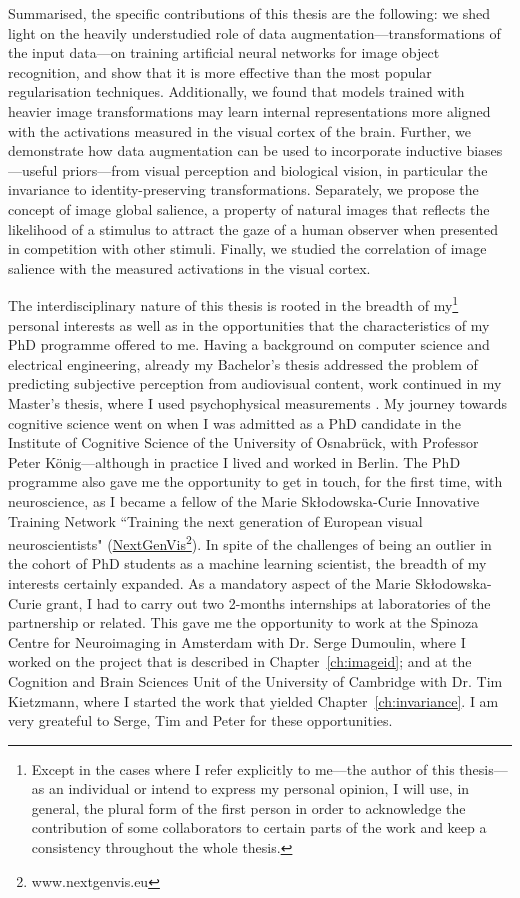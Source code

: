 {Summarised, the specific contributions of this thesis are the following: we shed light on the heavily understudied role of data augmentation---transformations of the input data---on training artificial neural networks for image object recognition, and show that it is more effective than the most popular regularisation techniques. Additionally, we found that models trained with heavier image transformations may learn internal representations more aligned with the activations measured in the visual cortex of the brain. Further, we demonstrate how data augmentation can be used to incorporate inductive biases---useful priors---from visual perception and biological vision, in particular the invariance to identity-preserving transformations. Separately, we propose the concept of image global salience, a property of natural images that reflects the likelihood of a stimulus to attract the gaze of a human observer when presented in competition with other stimuli. Finally, we studied the correlation of image salience with the measured activations in the visual cortex.

The interdisciplinary nature of this thesis is rooted in the breadth of my\footnote{Except in the cases where I refer explicitly to me---the author of this thesis---as an individual or intend to express my personal opinion, I will use, in general, the plural form of the first person in order to acknowledge the contribution of some collaborators to certain parts of the work and keep a consistency throughout the whole thesis.} personal interests as well as in the opportunities that the characteristics of my PhD programme offered to me. Having a background on computer science and electrical engineering, already my Bachelor's thesis \citep{hernandez2014bscthesis} addressed the problem of predicting subjective perception from audiovisual content, work continued in my Master's thesis, where I used psychophysical measurements \citep{hernandez2017mscthesis}. My journey towards cognitive science went on when I was admitted as a PhD candidate in the Institute of Cognitive Science of the University of Osnabrück, with Professor Peter König---although in practice I lived and worked in Berlin. The PhD programme also gave me the opportunity to get in touch, for the first time, with neuroscience, as I became a fellow of the Marie Skłodowska-Curie Innovative Training Network ``Training the next generation of European visual neuroscientists" (\href{http://nextgenvis.eu}{NextGenVis\footnote{\href{http://nextgenvis.eu}{www.nextgenvis.eu}}}). In spite of the challenges of being an outlier in the cohort of PhD students as a machine learning scientist, the breadth of my interests certainly expanded. As a mandatory aspect of the Marie Skłodowska-Curie grant, I had to carry out two 2-months internships at laboratories of the partnership or related. This gave me the opportunity to work at the Spinoza Centre for Neuroimaging in Amsterdam with Dr. Serge Dumoulin, where I worked on the project that is described in Chapter~\ref{ch:imageid}; and at the Cognition and Brain Sciences Unit of the University of Cambridge with Dr. Tim Kietzmann, where I started the work that yielded Chapter~\ref{ch:invariance}. I am very greateful to Serge, Tim and Peter for these opportunities.

}
